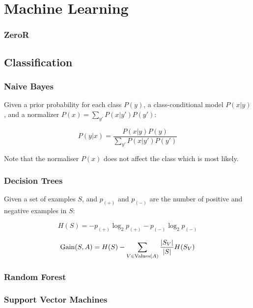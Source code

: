 \section{Machine Learning}


\subsubsection{ZeroR}


\subsection{Classification}


\subsubsection{Naive Bayes}


Given a prior probability for each class $P(y)$, a class-conditional
model $P(x|y)$, and a normalizer $P(x) = \sum_{y'}P(x|y')P(y')$:

\begin{equation}
P(y|x) = \frac{P(x|y)P(y)}{\sum_{y'}P(x|y')P(y')}
\end{equation}

Note that the normaliser $P(x)$ does not affect the class which is
most likely.


\subsubsection{Decision Trees}

Given a set of examples $S$, and $p_{(+)}$ and $p_{(-)}$ are the
number of positive and negative examples in $S$:

\begin{equation}
  H(S) = - p_{(+)}\log_2p_{(+)} - p_{(-)}\log_2p_{(-)}
\end{equation}

\begin{equation}
  \operatorname*{Gain}(S, A) = H(S) - \sum_{V \in \text{Values}(A)}\frac{|S_V|}{|S|}H(S_V)
\end{equation}


\subsubsection{Random Forest}


\subsubsection{Support Vector Machines}

